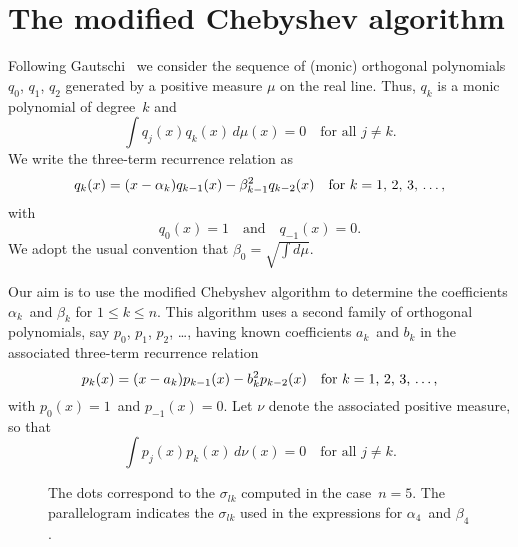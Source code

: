 \documentclass[12pt,a4paper]{article}
\begin{document}
\section{The modified Chebyshev algorithm}
Following Gautschi~\cite{Gautschi1982} we consider the sequence of 
(monic) orthogonal polynomials $q_0$, $q_1$, $q_2$ generated by a 
positive measure $\mu$ on the real line.  Thus, $q_k$ is a monic 
polynomial of degree~$k$ and
\[
\int q_j(x)q_k(x)\,d\mu(x)=0\quad\text{for all $j\ne k$.}
\]
We write the three-term recurrence relation as
\begin{equation}\label{eq: 3 term q}
q_k(x)=(x-\alpha_k)q_{k-1}(x)-\beta_{k-1}^2 q_{k-2}(x)
	\quad\text{for $k=1$, $2$, $3$, \dots,}
\end{equation}
with
\[
q_0(x)=1\quad\text{and}\quad q_{-1}(x)=0.
\]
We adopt the usual convention that $\beta_0=\sqrt{\int d\mu}$.

Our aim is to use the modified Chebyshev algorithm to determine the 
coefficients $\alpha_k$~and $\beta_k$ for $1\le k\le n$.
This algorithm uses a second family of orthogonal polynomials, say
$p_0$, $p_1$, $p_2$, \dots, having known coefficients $a_k$~and $b_k$ 
in the associated three-term recurrence relation
\[
p_k(x)=(x-a_k)p_{k-1}(x)-b_k^2p_{k-2}(x)
	\quad\text{for $k=1$, $2$, $3$, \dots,}
\]
with $p_0(x)=1$~and $p_{-1}(x)=0$.  Let $\nu$ denote the associated 
positive measure, so that
\[
\int p_j(x)p_k(x)\,d\nu(x)=0\quad\text{for all $j\ne k$.}
\]

\begin{figure}
\caption{The dots correspond to the $\sigma_{lk}$ computed in the 
case~$n=5$.  The parallelogram indicates the $\sigma_{lk}$ used in 
the expressions for $\alpha_4$~and $\beta_4$.}
\begin{center}
\end{center}
\end{figure}
\end{document}
